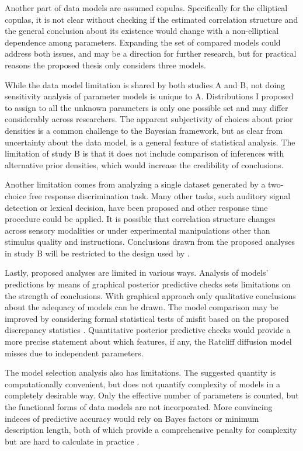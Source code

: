 \documentclass[12pt]{report}
\begin{document}
Another part of data models are assumed copulas. Specifically for the elliptical copulas, it is not clear without checking if the estimated correlation structure and the general conclusion about its existence would change with a non-elliptical dependence among parameters. Expanding the set of compared models could address both issues, and may be a direction for further research, but for practical reasons the proposed thesis only considers three models.

While the data model limitation is shared by both studies A and B, not doing sensitivity analysis of parameter models is unique to A. Distributions I proposed to assign to all the unknown parameters is only one possible set and may differ considerably across researchers. The apparent subjectivity of choices about prior densities is a common challenge to the Bayesian framework, but as clear from uncertainty about the data model, is a general feature of statistical analysis. The limitation of study B is that it does not include comparison of inferences with alternative prior densities, which would increase the credibility of conclusions.

Another limitation comes from analyzing a single dataset generated by a two-choice free response discrimination task. Many other tasks, such auditory signal detection or lexical decision, have been proposed and other response time procedure could be applied. It is possible that correlation structure changes across sensory modalities or under experimental manipulations other than stimulus quality and instructions. Conclusions drawn from the proposed analyses in study B will be restricted to the design used by \citet{RatRou1998}.

Lastly, proposed analyses are limited in various ways. Analysis of models' predictions by means of graphical posterior predictive checks sets limitations on the strength of conclusions. With graphical approach only qualitative conclusions about the adequacy of models can be drawn. The model comparison may be improved by considering formal statistical tests of misfit based on the proposed discrepancy statistics \citep{GelCar2013}. Quantitative posterior predictive checks would provide a more precise statement about which features, if any, the Ratcliff diffusion model misses due to independent parameters.

The model selection analysis also has limitations. The suggested quantity is computationally convenient, but does not quantify complexity of models in a completely desirable way. Only the effective number of parameters is counted, but the functional forms of data models are not incorporated. More convincing indeces of predictive accuracy would rely on Bayes factors or minimum description length, both of which provide a comprehensive penalty for complexity but are hard to calculate in practice \citep{MyuKar2008,CavMyu2013,GelHwa2013}. 

\renewcommand{\bibsection}{\chapter{\bibname}}


\end{document}
